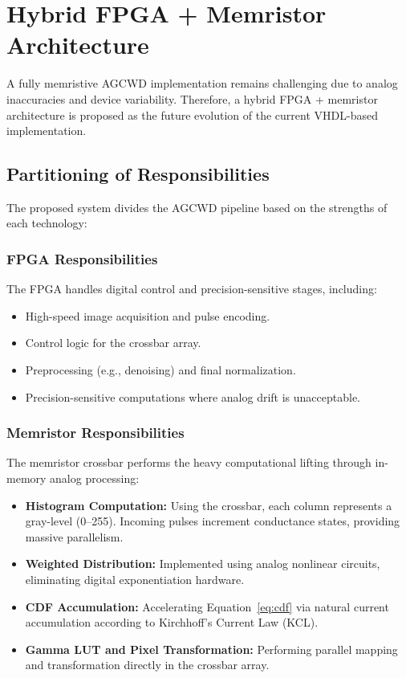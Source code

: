 \documentclass[conference]{IEEEtran}
\begin{document}
\section{Hybrid FPGA + Memristor Architecture}
\label{sec:hybrid}

A fully memristive AGCWD implementation remains challenging due to analog inaccuracies and device variability. Therefore, a hybrid FPGA + memristor architecture is proposed as the future evolution of the current VHDL-based implementation.

\subsection{Partitioning of Responsibilities}

The proposed system divides the AGCWD pipeline based on the strengths of each technology:

\subsubsection{FPGA Responsibilities}
The FPGA handles digital control and precision-sensitive stages, including:
\begin{itemize}
    \item High-speed image acquisition and pulse encoding.
    \item Control logic for the crossbar array.
    \item Preprocessing (e.g., denoising) and final normalization.
    \item Precision-sensitive computations where analog drift is unacceptable.
\end{itemize}

\subsubsection{Memristor Responsibilities}
The memristor crossbar performs the heavy computational lifting through in-memory analog processing:
\begin{itemize}
    \item \textbf{Histogram Computation:} Using the crossbar, each column represents a gray-level (0--255). Incoming pulses increment conductance states, providing massive parallelism.
    \item \textbf{Weighted Distribution:} Implemented using analog nonlinear circuits, eliminating digital exponentiation hardware.
    \item \textbf{CDF Accumulation:} Accelerating Equation~\eqref{eq:cdf} via natural current accumulation according to Kirchhoff’s Current Law (KCL).
    \item \textbf{Gamma LUT and Pixel Transformation:} Performing parallel mapping and transformation directly in the crossbar array.
\end{itemize}
\end{document}
